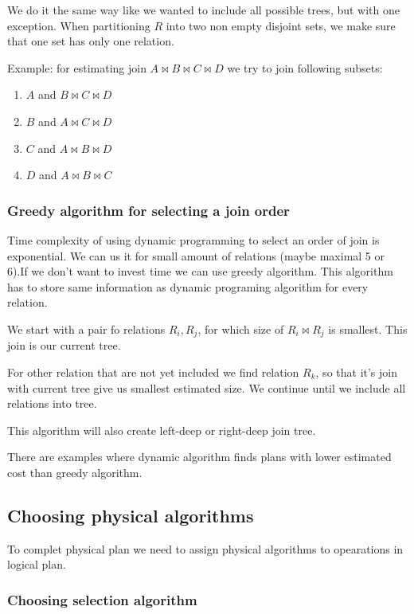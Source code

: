 We do it the same way like we wanted to include all possible trees, but with one exception. When partitioning $R$ into two non empty disjoint sets, we make sure that one set has only one relation.

Example: for estimating join $A\Join B\Join C\Join D$ we try to join following subsets:
\begin{enumerate}
\item $A$ and $B\Join C\Join D$
\item $B$ and $A\Join C\Join D$
\item $C$ and $A\Join B\Join D$
\item $D$ and $A\Join B\Join C$
\end{enumerate}

\subsubsection{Greedy algorithm for selecting a join order}

Time complexity of using dynamic programming to select an order of join is exponential. We can us it for small amount of relations (maybe maximal 5 or 6).If we don't want to invest time we can use greedy algorithm. This algorithm has to store same information as dynamic programing algorithm for every relation.

We start with a pair fo relations $R_i, R_j$, for which size of $R_i \Join R_j$ is smallest. This join is our current tree.

For other relation that are not yet included we find relation $R_k$, so that it's join with current tree give us smallest estimated size. We continue until we include all relations into tree. 

This algorithm will also create left-deep or right-deep join tree.

There are examples where dynamic algorithm finds plans with lower estimated cost than greedy algorithm.
 
\subsection{Choosing physical algorithms}

To complet physical plan we need to assign physical algorithms to opearations in logical plan.
\subsubsection{Choosing selection algorithm}



